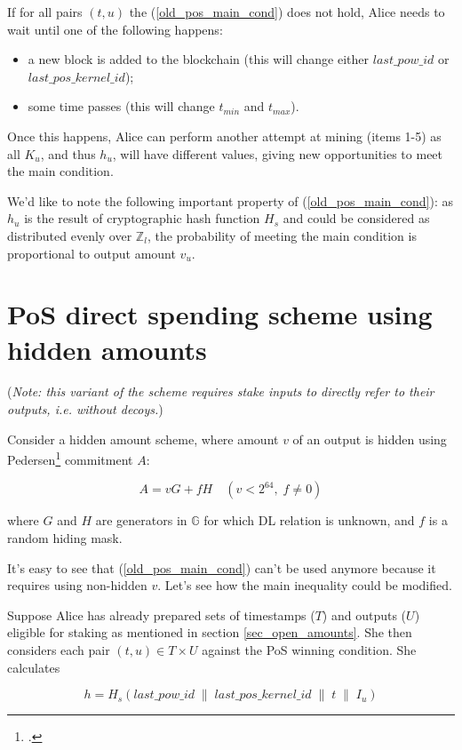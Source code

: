 \documentclass{article}
\numberwithin{figure}{section}
\begin{document}
If for all pairs $(t, u)$ the (\ref{old_pos_main_cond}) does not hold, Alice needs to wait until one of the following happens:
\begin{itemize}
    \item a new block is added to the blockchain (this will change either $last\_pow\_id$ or $last\_pos\_kernel\_id$);
    \item some time passes (this will change $t_{min}$ and $t_{max}$).
\end{itemize}

\indent
Once this happens, Alice can perform another attempt at mining (items 1-5) as all $K_u$, and thus $h_u$, will have different values, giving new opportunities to meet the main condition.


We'd like to note the following important property of (\ref{old_pos_main_cond}): as $h_u$ is the result of cryptographic hash function $H_s$ and could be considered as distributed evenly over $\mathbb{Z}_l$, the probability of meeting the main condition is proportional to output amount $v_u$. 


\section{PoS direct spending scheme using hidden amounts} \label{sec_direct_spend}

\noindent (\textit{Note: this variant of the scheme requires stake inputs to directly refer to their outputs, i.e. without decoys.})

Consider a hidden amount scheme, where amount $v$ of an output is hidden using Pedersen\footcite[More information in original paper by T.P. Pedersen: ][]{Ped} commitment $A$:

\[ A = v G + f H \quad (v < 2^{64}, \; f \neq 0) \]

where $G$ and $H$ are generators in $\mathbb{G}$ for which DL relation is unknown, and $f$ is a random hiding mask.

It's easy to see that (\ref{old_pos_main_cond}) can't be used anymore because it requires using non-hidden $v$. Let's see how the main inequality could be modified.

Suppose Alice has already prepared sets of timestamps ($T$) and outputs ($U$) eligible for staking as mentioned in section \ref{sec_open_amounts}. She then considers each pair $(t, u) \in T \times U$ against the PoS winning condition. She calculates

\[ h = H_s( last\_pow\_id \;\|\; last\_pos\_kernel\_id \;\|\; t \;\|\; I_u ) \]
\end{document}
